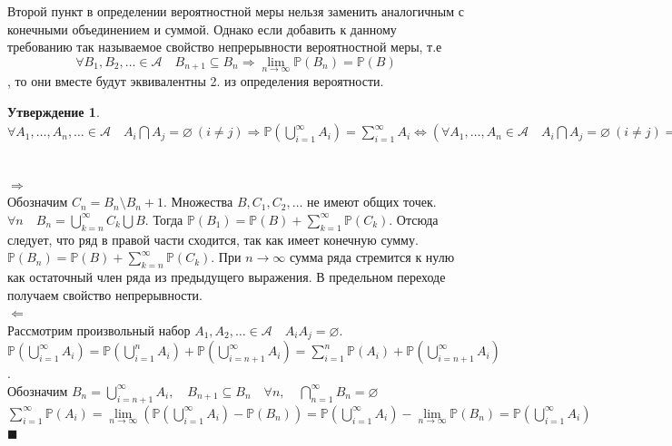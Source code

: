 \documentclass[12pt]{article}
\newtheorem{St}{Утверждение}
\newenvironment{Proof}{\par\noindent{\bf Доказательство}}{$\blacksquare$}
\numberwithin{Th}{section}
\numberwithin{Def}{section}
\numberwithin{Lem}{section}
\numberwithin{St}{section}
\numberwithin{equation}{section}
\newcommand\Pro{\mathbb{P}} %
\newcommand\Ev{\mathscr{A}} %
\begin{document}
Второй пункт в определении вероятностной меры нельзя заменить аналогичным с конечными объединением и суммой. Однако если добавить к данному требованию так 
называемое свойство непрерывности вероятностной меры, т.е $$\forall B_1, B_2, \ldots \in \Ev \quad B_{n+1} \subseteq B_n \Rightarrow \lim_{n \to \infty} \Pro(B_n) = \Pro(B)$$, то они вместе будут эквивалентны 2. из определения вероятности.

\begin{St}
$\forall A_1, \dots, A_n, \ldots \in \Ev \quad A_i \bigcap A_j  = \varnothing\  (i \not= j)  \Rightarrow \Pro (\bigcup\limits_{i=1}^{\infty} A_i) = \sum\limits_{i = 1}^{\infty} A_i
\Leftrightarrow ( \forall A_1, \dots, A_n \in \Ev \quad A_i \bigcap A_j  = \varnothing\  (i \not= j)  \Rightarrow \Pro (\bigcup\limits_{i=1}^{n} A_i) = \sum\limits_{i = 1}^{n} A_i)  \land  (\forall B_1, B_2, \ldots \in \Ev \quad B_{n+1} \subseteq B_n \Rightarrow \lim\limits_{n \to \infty} \Pro(B_n) = \Pro(B))$
\end{St}
\begin{Proof}
\\ $\Rightarrow$\\
Обозначим $C_n = B_n \setminus B_n+1$. Множества $B, C_1, C_2, \ldots$ не имеют общих точек.\\
$\forall n \quad B_n =  \bigcup\limits_{k=n}^{\infty} C_k \bigcup B$. Тогда $\Pro(B_1) = \Pro(B) + \sum\limits_{k=1}^{\infty} \Pro(C_k)$. Отсюда следует, что ряд в правой части сходится, так как имеет конечную сумму.
$\Pro(B_n) = \Pro(B) + \sum\limits_{k=n}^{\infty} \Pro(C_k)$. При $n \to \infty$ сумма ряда стремится к нулю как остаточный член ряда из предыдущего выражения.
В предельном переходе получаем свойство непрерывности.
\\ $\Leftarrow$\\
Рассмотрим произвольный набор $A_1, A_2, \ldots \in \Ev \quad A_iA_j = \varnothing$.\\
$\Pro(\bigcup\limits_{i=1}^{\infty} A_i) = \Pro(\bigcup\limits_{i=1}^{n} A_i) + \Pro(\bigcup\limits_{i=n + 1}^{\infty} A_i) =\sum\limits_{i = 1}^{n} \Pro(A_i) +  
\Pro(\bigcup\limits_{i=n + 1}^{\infty} A_i) $.\\
 Обозначим $B_n = \bigcup\limits_{i=n + 1}^{\infty} A_i,\quad B_{n+1} \subseteq B_n \quad \forall n,\quad \bigcap\limits_{n=1}^{\infty} B_n= \varnothing$ \\
$\sum\limits_{i=1}^{\infty} \Pro(A_i) = \lim\limits_{n \to \infty} (\Pro(\bigcup\limits_{i=1}^{\infty} A_i) - \Pro(B_n)) = \Pro(\bigcup\limits_{i=1}^{\infty} A_i) - \lim\limits_{n \to \infty} \Pro(B_n) = \Pro(\bigcup\limits_{i=1}^{\infty} A_i)$
\end{Proof}
\end{document}
